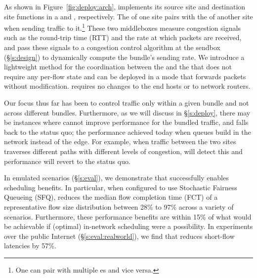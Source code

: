 
As shown in Figure~\ref{fig:deploy:arch}, \name implements its source site and destination site functions in a \emph{\inbox} and \emph{\outbox}, respectively. The \inbox of one site pairs with the \outbox of another site when sending traffic to it.\footnote{One \inbox can pair with multiple {\outbox}es and vice versa.} 
These two middleboxes measure congestion signals such as the round-trip time (RTT) and the rate at which packets are received, and pass these signals to a congestion control algorithm at the sendbox (\S\ref{s:design}) to dynamically compute the bundle's sending rate.
We introduce a lightweight method for the coordination between the \inbox and the \outbox that does not require any per-flow state and can be deployed in a mode that forwards packets without modification.  \name requires no changes to the end hosts or to network routers.
 
Our focus thus far has been to control traffic only within a given bundle and not across different bundles. 
Furthermore, as we will discuss in \S\ref{s:deploy}, there may be instances where \name cannot improve performance for the bundled traffic, and falls back to the status quo; \ie the performance achieved today when queues build in the network instead of the edge. For example, when traffic between the two sites traverses different paths with different levels of congestion, \name will detect this and performance will revert to the status quo.
 
In emulated scenarios (\S\ref{s:eval}), we demonstrate that \name successfully enables scheduling benefits. In particular, when configured to use Stochastic Fairness Queueing (SFQ),
\name reduces the median flow completion time (FCT) of a representative flow size distribution between 28\% to 97\% across a variety of scenarios. Furthermore, these performance benefits are within 15\% of what would be achievable if (optimal) in-network scheduling were a possibility.
In experiments over the public Internet (\S\ref{s:eval:realworld}), we find that \name reduces short-flow latencies by 57\%.

